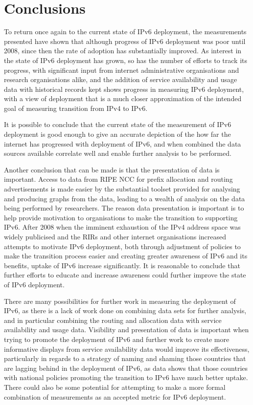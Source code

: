 \section{Conclusions}

To return once again to the current state of IPv6 deployment, the measurements
presented have shown that although progress of IPv6 deployment was poor until
2008, since then the rate of adoption has substantially improved. As interest in
the state of IPv6 deployment has grown, so has the number of efforts to track
its progress, with significant input from internet administrative organisations
and research organisations alike, and the addition of service availability and
usage data with historical records kept shows progress in measuring IPv6
deployment, with a view of deployment that is a much closer 
approximation of the intended goal of measuring transition from IPv4 to IPv6.

It is possible to conclude that the current state of the measurement of IPv6
deployment is good enough to give an accurate depiction of the how far the
internet has progressed with deployment of IPv6, and when combined the data
sources available correlate well and enable further analysis to be performed.

Another conclusion that can be made is that the presentation of data is
important. Access to data from RIPE NCC for prefix allocation and routing
advertisements is made easier by the substantial toolset provided for analysing
and producing graphs from the data, leading to a wealth of analysis on the data
being performed by researchers. The reason data presentation is important is
to help provide motivation to organisations to make the transition to supporting
IPv6. After 2008 when the imminent exhaustion of the IPv4 address space was
widely publicised and the RIRs and other internet organisations increased
attempts to motivate IPv6 deployment, both through adjustment of policies to
make the transition process easier and creating greater awareness of IPv6 and
its benefits, uptake of IPv6 increase significantly. It is reasonable to
conclude that further efforts to educate and increase awareness could further
improve the state of IPv6 deployment.

There are many possibilities for further work in measuring the deployment of
IPv6, as there is a lack of work done on combining data sets for further
analysis, and in particular combining the routing and allocation data with
service availability and usage data. Visibility and presentation of data is
important when trying to promote the deployment of IPv6 and further work to
create more informative displays from service availability data would improve
its effectiveness, particularly in regards to a strategy of naming and shaming
those countries that are lagging behind in the deployment of IPv6, as data shows
that those countries with national policies promoting the transition to IPv6
have much better uptake\cite{olivier_mj_crepin-leblond_ipv6_2011}. There could also be some potential for
attempting to make a more formal combination of measurements as an accepted
metric for IPv6 deployment.

